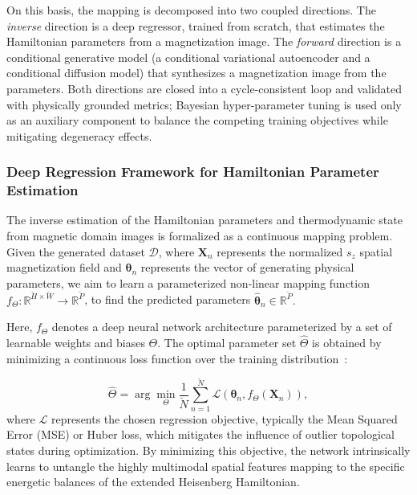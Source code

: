 \documentclass[letterpaper, 12, one column]{article}
\begin{document}
On this basis, the mapping is decomposed into two coupled directions. The \emph{inverse} direction is a deep regressor, trained from scratch, that estimates the Hamiltonian parameters from a magnetization image. The \emph{forward} direction is a conditional generative model (a conditional variational autoencoder and a conditional diffusion model) that synthesizes a magnetization image from the parameters. Both directions are closed into a cycle-consistent loop and validated with physically grounded metrics; Bayesian hyper-parameter tuning is used only as an auxiliary component to balance the competing training objectives while mitigating degeneracy effects.

\subsubsection{Deep Regression Framework for Hamiltonian Parameter Estimation}\label{sec:deep_regression}

The inverse estimation of the Hamiltonian parameters and thermodynamic state from magnetic domain images is formalized as a continuous mapping problem. Given the generated dataset $\mathcal{D}$, where $\mathbf{X}_n$ represents the normalized $s_z$ spatial magnetization field and $\boldsymbol{\theta}_n$ represents the vector of generating physical parameters, we aim to learn a parameterized non-linear mapping function $f_\Theta : \mathbb{R}^{\breve{H} \times \breve{W}} \rightarrow \mathbb{R}^{\breve{P}}$, to find the predicted parameters $\hat{\boldsymbol{\theta}}_n\in\mathbb{R}^{\breve{P}}.$

Here, $f_\Theta$ denotes a deep neural network architecture parameterized by a set of learnable weights and biases $\Theta$. The optimal parameter set $\hat{\Theta}$ is obtained by minimizing a continuous loss function over the training distribution~\cite{murphy2023probabilistic}:

\begin{equation}\label{eq:LossFunction}
\hat{\Theta} = \arg\min_{\Theta} \frac{1}{\breve{N}} \sum_{n=1}^{\breve{N}} \mathcal{L}\left(\boldsymbol{\theta}_n, f_\Theta(\mathbf{X}_n)\right),
\end{equation}
where $\mathcal{L}$ represents the chosen regression objective, typically the Mean Squared Error (MSE) or Huber loss, which mitigates the influence of outlier topological states during optimization. By minimizing this objective, the network intrinsically learns to untangle the highly multimodal spatial features mapping to the specific energetic balances of the extended Heisenberg Hamiltonian.
\end{document}
